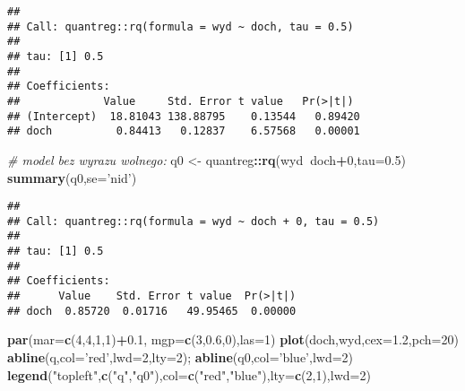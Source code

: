 \documentclass[polish,]{book}
\newenvironment{Shaded}{\begin{snugshade}}{\end{snugshade}}
\newcommand{\CommentTok}[1]{\textcolor[rgb]{0.56,0.35,0.01}{\textit{#1}}}
\newcommand{\DataTypeTok}[1]{\textcolor[rgb]{0.13,0.29,0.53}{#1}}
\newcommand{\DecValTok}[1]{\textcolor[rgb]{0.00,0.00,0.81}{#1}}
\newcommand{\FloatTok}[1]{\textcolor[rgb]{0.00,0.00,0.81}{#1}}
\newcommand{\KeywordTok}[1]{\textcolor[rgb]{0.13,0.29,0.53}{\textbf{#1}}}
\newcommand{\NormalTok}[1]{#1}
\newcommand{\OperatorTok}[1]{\textcolor[rgb]{0.81,0.36,0.00}{\textbf{#1}}}
\newcommand{\StringTok}[1]{\textcolor[rgb]{0.31,0.60,0.02}{#1}}
\begin{document}
\begin{verbatim}
## 
## Call: quantreg::rq(formula = wyd ~ doch, tau = 0.5)
## 
## tau: [1] 0.5
## 
## Coefficients:
##             Value     Std. Error t value   Pr(>|t|) 
## (Intercept)  18.81043 138.88795    0.13544   0.89420
## doch          0.84413   0.12837    6.57568   0.00001
\end{verbatim}

\begin{Shaded}
\begin{Highlighting}[]
\CommentTok{# model bez wyrazu wolnego:}
\NormalTok{q0 <-}\StringTok{ }\NormalTok{quantreg}\OperatorTok{::}\KeywordTok{rq}\NormalTok{(wyd}\OperatorTok{~}\NormalTok{doch}\OperatorTok{+}\DecValTok{0}\NormalTok{,}\DataTypeTok{tau=}\FloatTok{0.5}\NormalTok{)}
\KeywordTok{summary}\NormalTok{(q0,}\DataTypeTok{se=}\StringTok{'nid'}\NormalTok{)}
\end{Highlighting}
\end{Shaded}

\begin{verbatim}
## 
## Call: quantreg::rq(formula = wyd ~ doch + 0, tau = 0.5)
## 
## tau: [1] 0.5
## 
## Coefficients:
##      Value    Std. Error t value  Pr(>|t|)
## doch  0.85720  0.01716   49.95465  0.00000
\end{verbatim}

\begin{Shaded}
\begin{Highlighting}[]
\KeywordTok{par}\NormalTok{(}\DataTypeTok{mar=}\KeywordTok{c}\NormalTok{(}\DecValTok{4}\NormalTok{,}\DecValTok{4}\NormalTok{,}\DecValTok{1}\NormalTok{,}\DecValTok{1}\NormalTok{)}\OperatorTok{+}\FloatTok{0.1}\NormalTok{, }\DataTypeTok{mgp=}\KeywordTok{c}\NormalTok{(}\DecValTok{3}\NormalTok{,}\FloatTok{0.6}\NormalTok{,}\DecValTok{0}\NormalTok{),}\DataTypeTok{las=}\DecValTok{1}\NormalTok{)}
\KeywordTok{plot}\NormalTok{(doch,wyd,}\DataTypeTok{cex=}\FloatTok{1.2}\NormalTok{,}\DataTypeTok{pch=}\DecValTok{20}\NormalTok{)}
\KeywordTok{abline}\NormalTok{(q,}\DataTypeTok{col=}\StringTok{'red'}\NormalTok{,}\DataTypeTok{lwd=}\DecValTok{2}\NormalTok{,}\DataTypeTok{lty=}\DecValTok{2}\NormalTok{); }\KeywordTok{abline}\NormalTok{(q0,}\DataTypeTok{col=}\StringTok{'blue'}\NormalTok{,}\DataTypeTok{lwd=}\DecValTok{2}\NormalTok{)}
\KeywordTok{legend}\NormalTok{(}\StringTok{"topleft"}\NormalTok{,}\KeywordTok{c}\NormalTok{(}\StringTok{"q"}\NormalTok{,}\StringTok{"q0"}\NormalTok{),}\DataTypeTok{col=}\KeywordTok{c}\NormalTok{(}\StringTok{"red"}\NormalTok{,}\StringTok{"blue"}\NormalTok{),}\DataTypeTok{lty=}\KeywordTok{c}\NormalTok{(}\DecValTok{2}\NormalTok{,}\DecValTok{1}\NormalTok{),}\DataTypeTok{lwd=}\DecValTok{2}\NormalTok{)}
\end{Highlighting}
\end{Shaded}
\end{document}
